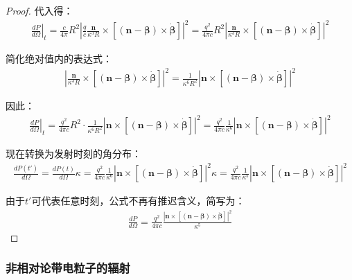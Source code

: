 \begin{proof}
代入得：
\begin{align}
\left.\frac{dP}{d\Omega}\right|_t = \frac{c}{4\pi} R^2 \left| \frac{q}{c} \frac{\mathbf{n}}{\kappa^3 R} \times [(\mathbf{n}-\boldsymbol{\beta}) \times \dot{\boldsymbol{\beta}}] \right|^2 = \frac{q^2}{4\pi c} R^2 \left| \frac{\mathbf{n}}{\kappa^3 R} \times [(\mathbf{n}-\boldsymbol{\beta}) \times \dot{\boldsymbol{\beta}}] \right|^2
\end{align}

简化绝对值内的表达式：
\begin{align}
\left| \frac{\mathbf{n}}{\kappa^3 R} \times [(\mathbf{n}-\boldsymbol{\beta}) \times \dot{\boldsymbol{\beta}}] \right|^2 = \frac{1}{\kappa^6 R^2} \left| \mathbf{n} \times [(\mathbf{n}-\boldsymbol{\beta}) \times \dot{\boldsymbol{\beta}}] \right|^2
\end{align}

因此：
\begin{align}
\left.\frac{dP}{d\Omega}\right|_t = \frac{q^2}{4\pi c} R^2 \cdot \frac{1}{\kappa^6 R^2} \left| \mathbf{n} \times [(\mathbf{n}-\boldsymbol{\beta}) \times \dot{\boldsymbol{\beta}}] \right|^2 = \frac{q^2}{4\pi c} \frac{1}{\kappa^6} \left| \mathbf{n} \times [(\mathbf{n}-\boldsymbol{\beta}) \times \dot{\boldsymbol{\beta}}] \right|^2
\end{align}

现在转换为发射时刻的角分布：
\begin{align}
\frac{dP(t')}{d\Omega} = \frac{dP(t)}{d\Omega} \kappa = \frac{q^2}{4\pi c} \frac{1}{\kappa^6} \left| \mathbf{n} \times [(\mathbf{n}-\boldsymbol{\beta}) \times \dot{\boldsymbol{\beta}}] \right|^2 \kappa = \frac{q^2}{4\pi c} \frac{1}{\kappa^5} \left| \mathbf{n} \times [(\mathbf{n}-\boldsymbol{\beta}) \times \dot{\boldsymbol{\beta}}] \right|^2
\end{align}

由于$t'$可代表任意时刻，公式不再有推迟含义，简写为：
\begin{align}
\frac{dP}{d\Omega} = \frac{q^2}{4\pi c} \frac{\left|\mathbf{n} \times [(\mathbf{n}-\boldsymbol{\beta}) \times \dot{\boldsymbol{\beta}}]\right|^2}{\kappa^5}
\end{align}
\end{proof}



\subsubsection{非相对论带电粒子的辐射}

